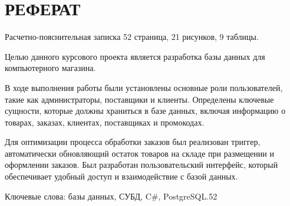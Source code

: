 \section*{\centering РЕФЕРАТ}
\setcounter{page}{3}

Расчетно-пояснительная записка 52 страница, 21 рисунков, 9 таблицы. 

Целью данного курсового проекта является разработка базы данных для компьютерного магазина.

В ходе выполнения работы были установлены основные роли пользователей, такие как администраторы, поставщики и клиенты. Определены ключевые сущности, которые должны храниться в базе данных, включая информацию о товарах, заказах, клиентах, поставщиках и промокодах.

Для оптимизации процесса обработки заказов был реализован триггер, автоматически обновляющий остаток товаров на складе при размещении и оформлении заказов. Был разработан пользовательский интерфейс, который обеспечивает удобный доступ и взаимодействие с базой данных.

Ключевые слова: базы данных, СУБД, C\#, PostgreSQL.52
